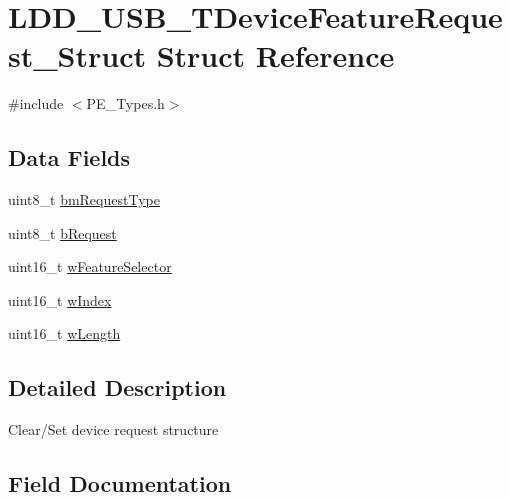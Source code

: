 \hypertarget{struct_l_d_d___u_s_b___t_device_feature_request___struct}{}\section{L\+D\+D\+\_\+\+U\+S\+B\+\_\+\+T\+Device\+Feature\+Request\+\_\+\+Struct Struct Reference}
\label{struct_l_d_d___u_s_b___t_device_feature_request___struct}


{\ttfamily \#include $<$P\+E\+\_\+\+Types.\+h$>$}

\subsection*{Data Fields}
\begin{DoxyCompactItemize}
\item 
uint8\+\_\+t \hyperlink{struct_l_d_d___u_s_b___t_device_feature_request___struct_a8258c0deaca59b3bd0c4d39c0dca9637}{bm\+Request\+Type}
\item 
uint8\+\_\+t \hyperlink{struct_l_d_d___u_s_b___t_device_feature_request___struct_a7dbfead1667063e1e2e7fb608362606a}{b\+Request}
\item 
uint16\+\_\+t \hyperlink{struct_l_d_d___u_s_b___t_device_feature_request___struct_a74dbb226786321c02ccad64b067b4ebe}{w\+Feature\+Selector}
\item 
uint16\+\_\+t \hyperlink{struct_l_d_d___u_s_b___t_device_feature_request___struct_a261267b70741fe26898665df42fec10b}{w\+Index}
\item 
uint16\+\_\+t \hyperlink{struct_l_d_d___u_s_b___t_device_feature_request___struct_af0c222aa4585a132b2582fb1c290edc7}{w\+Length}
\end{DoxyCompactItemize}


\subsection{Detailed Description}
Clear/\+Set device request structure 

\subsection{Field Documentation}
\mbox{\label{struct_l_d_d___u_s_b___t_device_feature_request___struct_a8258c0deaca59b3bd0c4d39c0dca9637}} 
